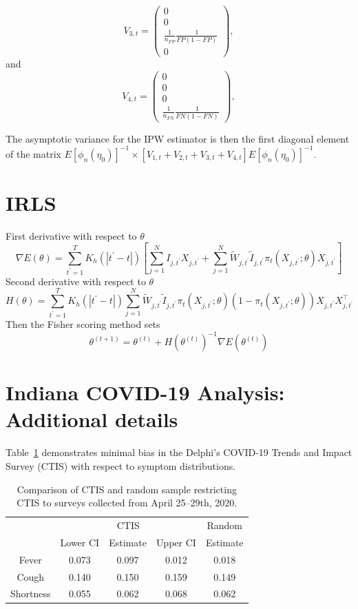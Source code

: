 \documentclass[11pt]{amsart}
\numberwithin{equation}{section}
\theoremstyle{plain}
\begin{document}
$$
V_{3,t} = \left( \begin{array}{c}
0 \\
0 \\
\frac{1}{n_{FP}} \frac{1}{FP(1-FP)} \\
0
\end{array}
\right),
$$
and
$$
V_{4,t} = \left( \begin{array}{c}
0 \\
0 \\
0 \\
\frac{1}{n_{FN}} \frac{1}{FN(1-FN)}
\end{array}
\right),
$$

The asymptotic variance for the IPW estimator is then the first diagonal element of the matrix $E \left[ \phi_n (\eta_0) \right]^{-1} \times \left[ V_{1,t} + V_{2,t} + V_{3,t} + V_{4,t} \right] E \left[ \phi_n (\eta_0) \right]^{-1}$.
\section{IRLS}
\label{app:irls}
First derivative with respect to $\theta$
$$
\nabla E(\theta) = \sum_{t^\prime=1}^T K_h(|t^\prime - t|) \left[ \sum_{j=1}^N I_{j,t^\prime} X_{j,t^\prime} + \sum_{j=1}^N \tilde W_{j,t^\prime} \tilde I_{j,t^\prime} \pi_t (X_{j,t^\prime}; \theta) X_{j,t^\prime} \right]
$$
Second derivative with respect to $\theta$
$$
H(\theta) = \sum_{t^\prime=1}^T K_h(|t^\prime - t|) \sum_{j=1}^N \tilde W_{j,t^\prime} \tilde I_{j,t^\prime} \pi_t (X_{j,t^\prime}; \theta) \left( 1- \pi_t (X_{j,t^\prime}; \theta) \right) X_{j,t^\prime} X_{j,t^\prime}^\top
$$
Then the Fisher scoring method sets
$$
\theta^{(t+1)} = \theta^{(t)} + H \left(\theta^{(t)} \right)^{-1} \nabla E \left(\theta^{(t)} \right)
$$

\section{Indiana COVID-19 Analysis: Additional details}
\label{app:in_add_details}

Table~\ref{tab:comparison} demonstrates minimal bias in the Delphi’s COVID-19 Trends and Impact Survey (CTIS) with respect to symptom distributions.

 \begin{table}[!th]
 \centering
 \begin{tabular}{c | c c c | c}
 & \multicolumn{3}{c}{CTIS} & Random \\ \cline{2-4}
 & Lower CI & Estimate & Upper CI & Estimate \\ \hline
 Fever &  0.073 & 0.097 & 0.012 & 0.018 \\
 Cough &  0.140 & 0.150 & 0.159 & 0.149 \\
 Shortness & 0.055 & 0.062 & 0.068 & 0.062 \\ \hline
 \end{tabular}
 \caption{Comparison of CTIS and random sample restricting CTIS to surveys collected from April 25--29th, 2020.}
 \label{tab:comparison}
 \end{table}
\end{document}
